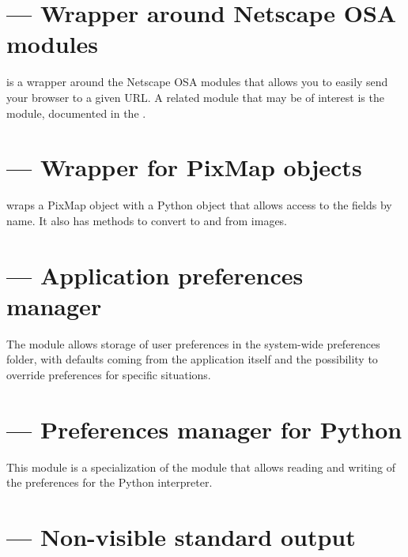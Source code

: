 \section{ --- Wrapper around Netscape OSA modules}

 is a wrapper around the Netscape OSA modules that
allows you to easily send your browser to a given URL.  A related
module that may be of interest is the  module,
documented in the .


\section{ --- Wrapper for PixMap objects}

 wraps a PixMap object with a Python object that
allows access to the fields by name. It also has methods to convert
to and from  images.


\section{ --- Application preferences manager}

The  module allows storage of user preferences in
the system-wide preferences folder, with defaults coming from the
application itself and the possibility to override preferences for
specific situations.


\section{ --- Preferences manager for Python}

This module is a specialization of the  module
that allows reading and writing of the preferences for the Python
interpreter.


\section{ --- Non-visible standard output}

